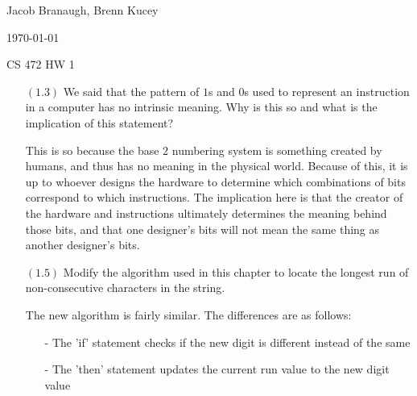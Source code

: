 \documentclass[letterpaper,10pt,titlepage]{article}
\def\name{Jacob Branaugh, Brenn Kucey}
\begin{document}
\hfill \name

\hfill \today

\hfill CS 472 HW 1

\begin{enumerate}
\item[$(1.3)$] We said that the pattern of $1$s and $0$s used to represent an instruction
  in a computer has no intrinsic meaning. Why is this so and what is the implication of
  this statement?
\item[\textbullet] This is so because the base 2 numbering system is something created by humans, and
	thus has no meaning in the physical world. Because of this, it is up to whoever
	designs the hardware to determine which combinations of bits correspond to which
	instructions. The implication here is that the creator of the hardware and
	instructions ultimately determines the meaning behind those bits, and that one
	designer's bits will not mean the same thing as another designer's bits.

\item[$(1.5)$] Modify the algorithm used in this chapter to locate the longest run of
  non-consecutive characters in the string.
\item[\textbullet] The new algorithm is fairly similar. The differences are as follows:
\begin{itemize}
	\item[-] The 'if' statement checks if the new digit is different instead of the
		 same
	\item[-] The 'then' statement updates the current run value to the new digit value
\end{itemize}


\end{enumerate}
\end{document}
